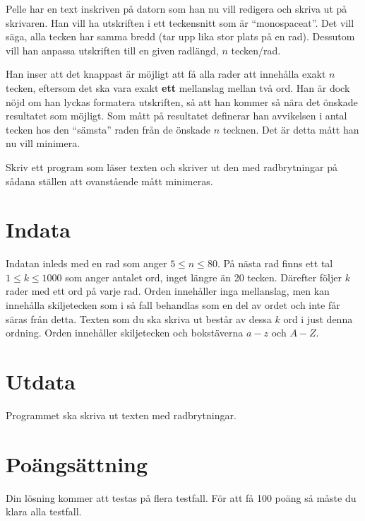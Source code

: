 
Pelle har en text inskriven på datorn som han nu vill redigera och skriva ut på skrivaren. Han vill ha utskriften i ett teckensnitt som är ``monospaceat''. Det vill säga, alla tecken har samma bredd (tar upp lika stor plats på en rad). Dessutom vill han anpassa utskriften till en given radlängd, $n$ tecken/rad.

Han inser att det knappast är möjligt att få alla rader att innehålla exakt $n$ tecken, eftersom det ska vara exakt \textbf{ett} mellanslag mellan två ord. Han är dock nöjd om han lyckas formatera utskriften, så att han kommer så nära det önskade resultatet som möjligt. Som mått på resultatet definerar han avvikelsen i antal tecken hos den ``sämsta'' raden från de önskade $n$ tecknen. Det är detta mått han nu vill minimera. 

Skriv ett program som läser texten och skriver ut den med radbrytningar på sådana ställen att ovanstående mått minimeras.

\section*{Indata}
Indatan inleds med en rad som anger $5 \le n \le 80$. På nästa rad finns ett tal $1 \le k \le 1000$ som anger antalet ord, inget längre än 20 tecken. Därefter följer $k$ rader med ett ord på varje rad. Orden innehåller inga mellanslag, men kan innehålla skiljetecken som i så fall behandlas som en del av ordet och inte får säras från detta. Texten som du ska skriva ut består av dessa $k$ ord i just denna ordning. Orden innehåller skiljetecken och bokstäverna $a-z$ och $A-Z$.

\section*{Utdata}
Programmet ska skriva ut texten med radbrytningar.

\section*{Poängsättning}
Din lösning kommer att testas på flera testfall. För att få 100 poäng så måste du klara alla testfall.
